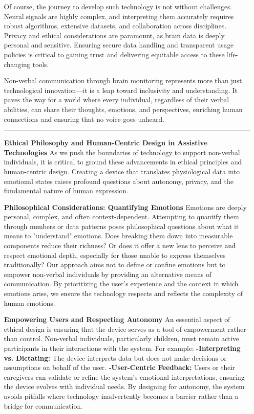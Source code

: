 \documentclass[12pt, research paper]{report}
\begin{document}
	\noindent Of course, the journey to develop such technology is not without challenges. Neural signals are highly complex, and interpreting them accurately requires robust algorithms, extensive datasets, and collaboration across disciplines. Privacy and ethical considerations are paramount, as brain data is deeply personal and sensitive. Ensuring secure data handling and transparent usage policies is critical to gaining trust and delivering equitable access to these life-changing tools.
	\bigskip
	
	\noindent Non-verbal communication through brain monitoring represents more than just technological innovation—it is a leap toward inclusivity and understanding. It paves the way for a world where every individual, regardless of their verbal abilities, can share their thoughts, emotions, and perspectives, enriching human connections and ensuring that no voice goes unheard.
	
	\noindent \rule{13.85cm}{0.01cm}
	\noindent \textbf{Ethical Philosophy and Human-Centric Design in Assistive Technologies}
	\newline As we push the boundaries of technology to support non-verbal individuals, it is critical to ground these advancements in ethical principles and human-centric design. Creating a device that translates physiological data into emotional states raises profound questions about autonomy, privacy, and the fundamental nature of human expression.
	\bigskip 
	
	\noindent \textbf{Philosophical Considerations: Quantifying Emotions}
	\newline Emotions are deeply personal, complex, and often context-dependent. Attempting to quantify them through numbers or data patterns poses philosophical questions about what it means to "understand" emotions. Does breaking them down into measurable components reduce their richness? Or does it offer a new lens to perceive and respect emotional depth, especially for those unable to express themselves traditionally? Our approach aims not to define or confine emotions but to empower non-verbal individuals by providing an alternative means of communication. By prioritizing the user’s experience and the context in which emotions arise, we ensure the technology respects and reflects the complexity of human emotions.
	\bigskip 
	
	\noindent \textbf{Empowering Users and Respecting Autonomy}
	\newline An essential aspect of ethical design is ensuring that the device serves as a tool of empowerment rather than control. Non-verbal individuals, particularly children, must remain active participants in their interactions with the system. For example:
	\newline \textbf{-Interpreting vs. Dictating:} The device interprets data but does not make decisions or assumptions on behalf of the user.
	\newline \textbf{-User-Centric Feedback:} Users or their caregivers can validate or refine the system’s emotional interpretations, ensuring the device evolves with individual needs.
	By designing for autonomy, the system avoids pitfalls where technology inadvertently becomes a barrier rather than a bridge for communication.
	\bigskip 
	
\end{document}
